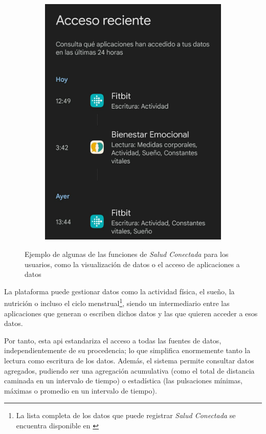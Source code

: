 \begin{figure}[h]
\begin{subfigure}[b]{0.49\textwidth}
                \includegraphics[width=1\linewidth]{figures/Health Connect acceso reciente.jpg}
            \end{subfigure}
            \caption{Ejemplo de algunas de las funciones de \textit{Salud Conectada} para los usuarios, como la visualización de datos o el acceso de aplicaciones a datos}
            \label{figure:health_connect:ejemplo}
        \end{figure}
        
        La plataforma puede gestionar datos como la actividad física, el sueño, la nutrición o incluso el ciclo menstrual\footnote{La lista completa de los datos que puede registrar \textit{Salud Conectada} se encuentra 
        disponible en \cite{android_developers_lista_nodate}}, siendo un intermediario entre las aplicaciones que generan o escriben dichos datos y las que quieren acceder a esos datos. 
        
        Por tanto, esta \gls{api} estandariza el acceso a todas las fuentes de datos, independientemente de su procedencia; lo que simplifica enormemente tanto la lectura como escritura de los datos. Además, el sistema permite consultar
        datos agregados, pudiendo ser una agregación acumulativa (como el total de distancia caminada en un intervalo de tiempo) o estadística (las pulsaciones mínimas, máximas o promedio en un intervalo de tiempo).

